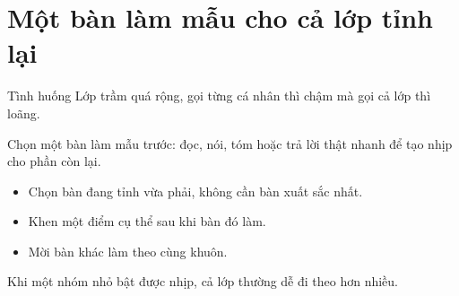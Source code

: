 \section{Một bàn làm mẫu cho cả lớp tỉnh lại}
\begin{tinhhuong}{Tình huống}
Lớp trầm quá rộng, gọi từng cá nhân thì chậm mà gọi cả lớp thì loãng.
\end{tinhhuong}
\begin{goiydungngay}
Chọn một bàn làm mẫu trước: đọc, nói, tóm hoặc trả lời thật nhanh để tạo nhịp cho phần còn lại.
\begin{itemize}
\item Chọn bàn đang tỉnh vừa phải, không cần bàn xuất sắc nhất.
\item Khen một điểm cụ thể sau khi bàn đó làm.
\item Mời bàn khác làm theo cùng khuôn.
\end{itemize}
\end{goiydungngay}
\begin{cauchot}
Khi một nhóm nhỏ bật được nhịp, cả lớp thường dễ đi theo hơn nhiều.
\end{cauchot}
